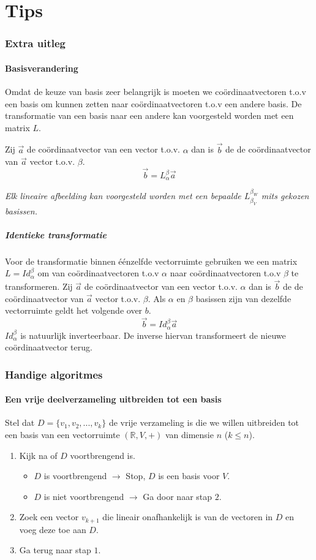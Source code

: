 \documentclass[lineaire_algebra_oplossingen.tex]{subfiles}
\begin{document}
\newpage
\part{Tips}
\section{Extra uitleg}
\subsection{Basisverandering}
Omdat de keuze van basis zeer belangrijk is moeten we co\"ordinaatvectoren t.o.v een basis om kunnen zetten naar co\"ordinaatvectoren t.o.v een andere basis. De transformatie van een basis naar een andere kan voorgesteld worden met een matrix $L$. 

Zij $\vec{a}$ de co\"ordinaatvector van een vector t.o.v. $\alpha$ dan is $\vec{b}$ de de co\"ordinaatvector van $\vec{a}$ vector t.o.v. $\beta$.
\[
\vec{b} = L_\alpha^\beta \vec{a}
\]

\emph{Elk lineaire afbeelding kan voorgesteld worden met een bepaalde $L_{\beta_V}^{\beta_W}$ mits gekozen basissen.}

\subsubsection{Identieke transformatie}
Voor de transformatie binnen \'e\'enzelfde vectorruimte gebruiken we een matrix $L = Id_\alpha^\beta$ om van co\"ordinaatvectoren t.o.v  $\alpha$ naar co\"ordinaatvectoren t.o.v $\beta$ te transformeren. Zij $\vec{a}$ de co\"ordinaatvector van een vector t.o.v. $\alpha$ dan is $\vec{b}$ de de co\"ordinaatvector van $\vec{a}$ vector t.o.v. $\beta$. Als $\alpha$ en $\beta$ basissen zijn van dezelfde vectorruimte geldt het volgende over $b$.
\[
\vec{b} = Id_\alpha^\beta \vec{a}
\]
$Id_\alpha^\beta$ is natuurlijk inverteerbaar. De inverse hiervan transformeert de nieuwe co\"ordinaatvector terug.

\section{Handige algoritmes}
\subsection{Een vrije deelverzameling uitbreiden tot een basis}
Stel dat $D = \{v_1,v_2,...,v_k\}$ de vrije verzameling is die we willen uitbreiden tot een basis van een vectorruimte $(\mathbb{R},V,+)$ van dimensie $n$ ($k\le n$).
\begin{enumerate}
\item Kijk na of $D$ voortbrengend is.
\begin{itemize}
\item $D$ is voortbrengend $\rightarrow$ Stop, $D$ is een  basis voor $V$.
\item $D$ is niet voortbrengend $\rightarrow$ Ga door naar stap $2$.
\end{itemize}
\item Zoek een vector $v_{k+1}$ die lineair onafhankelijk is van de vectoren in $D$ en voeg deze toe aan $D$.
\item Ga terug naar stap $1$.
\end{enumerate}
\end{document}
